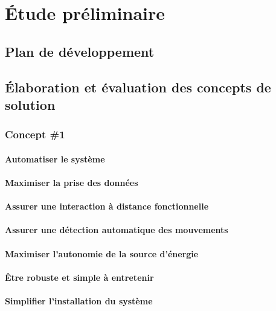 \chapter{Étude préliminaire}

\section{Plan de développement}




\section{Élaboration et évaluation des concepts de solution}

\subsection{Concept \#1}

\subsubsection{Automatiser le système}
\subsubsection*{Maximiser la prise des données}
\subsubsection*{Assurer une interaction à distance fonctionnelle}
\subsubsection*{Assurer une détection automatique des mouvements}
\subsubsection*{Maximiser l'autonomie de la source d'énergie}

\subsubsection{Être robuste et simple à entretenir}
\subsubsection*{Simplifier l'installation du système}
